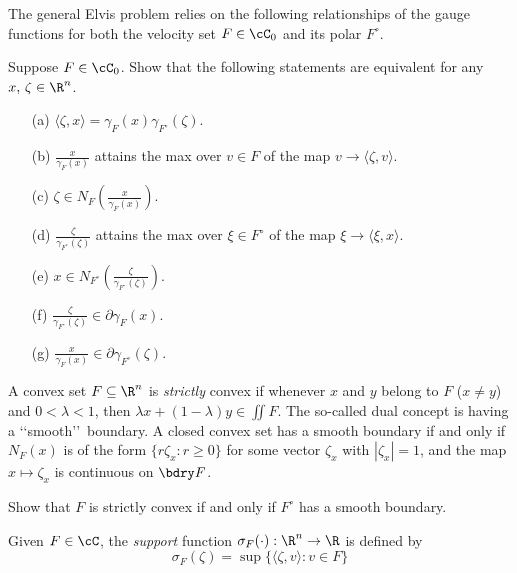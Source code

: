 \documentclass[12pt]{article}
\begin{document}
The general Elvis problem relies on the following relationships of the gauge functions for both the velocity set $F\in\cC_0$ and its polar $F^{\circ}$. 

{\blue
\begin{exer}\label{exer: diff gauge}
Suppose $F\in\cC_0$.  Show that the following statements are equivalent for any $x,\,\zeta\in\R^n$.
\begin{enumerate}
\item[(a)]  $\langle \zeta,x\rangle =
\gamma_{F}(x)\gamma_{F^{\circ}}(\zeta)$.
\item[(b)]  $\frac{x}{\gamma_{F}(x)}$ attains the max over $v\in F$
of the map $v\to \langle \zeta,v\rangle$.
\item[(c)]  $\zeta\in N_F\left(\frac{x}{\gamma_F(x)}\right)$.
\item[(d)]  $\frac{\zeta}{\gamma_{F^{\circ}}(\zeta)}$ attains the max
over $\xi\in F^{\circ}$ of the map $\xi\to \langle \xi,x\rangle$.
\item[(e)]  $x\in N_{F^{\circ}}\left(\frac{\zeta}{\gamma_{F^{\circ}}(\zeta)}\right)$.
\item[(f)]  $\frac{\zeta}{\gamma_{F^{\circ}}(\zeta)}\in\partial\gamma_F(x)$.
\item[(g)]  $\frac{x}{\gamma_{F}(x)}\in\partial\gamma_{F^{\circ}}(\zeta)$.
\end{enumerate}
\end{exer}
}

A convex set $F\subseteq\R^n$ is {\it strictly} convex if whenever $x$ and $y$ belong to $F$ ($x\not= y$) and $0<\lambda<1$, then $\lambda
x+(1-\lambda)y\in\iint F$.  The so-called dual concept is having a \lq\lq smooth\rq\rq\ boundary.  A closed convex set has a smooth boundary if and only if $N_F(x)$ is of the form $\{r\zeta_{x}:r\geq 0\}$ for some vector $\zeta_x$ with $|\zeta_x|=1$, and the map $x\mapsto \zeta_x$ is continuous on $\bdry F$.

{\blue
\begin{exer}  Show that $F$ is strictly convex if and only if $F^{\circ}$ has a smooth boundary.
\end{exer}}

Given $F\in\cC$, the {\em support} function $\sigma_{F}(\cdot):\R^n\to\R$ is defined by 
\[
\sigma_{F}(\zeta)=\sup\{\langle\zeta,v\rangle:v\in F\}
\]
\end{document}
